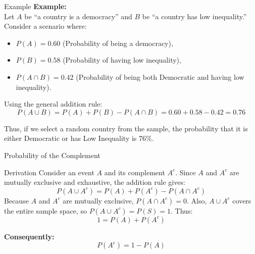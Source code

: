 \documentclass[handout]{beamer} %
\begin{document}
\begin{frame}{Example}
    \textbf{Example:}\\[0.5ex]
    Let \(A\) be “a country is a democracy” and \(B\) be “a country has low inequality.” Consider a scenario where:
    \begin{itemize}
        \item \(P(A) = 0.60\) (Probability of being a democracy),\pause
        \item \(P(B) = 0.58\) (Probability of having low inequality),\pause
        \item \(P(A \cap B) = 0.42\) (Probability of being both Democratic and having low inequality).\pause
    \end{itemize}
   
    Using the general addition rule:
    \[
    P(A \cup B) = P(A) + P(B) - P(A \cap B) = 0.60 + 0.58 - 0.42 = 0.76
    \]
   
    Thus, if we select a random country from the sample, the probability that it is either Democratic or has Low Inequality is 76\%.
\end{frame}

\begin{frame}{Probability of the Complement}   

    \begin{block}{Derivation}
        Consider an event \(A\) and its complement \(A^c\). Since \(A\) and \(A^c\) are mutually exclusive and exhaustive, the addition rule gives:\pause
        \[
        P(A \cup A^c) = P(A) + P(A^c) - P(A \cap A^c)
        \]\pause
        Because \(A\) and \(A^c\) are mutually exclusive, \(P(A \cap A^c) = 0\). \pause Also, \(A \cup A^c\) covers the entire sample space, so \(P(A \cup A^c) = P(S) = 1\). \pause Thus:
        \[
        1 = P(A) + P(A^c)
        \] \pause
    \end{block}
    \pause
    \textbf{Consequently:}
    \[
    P(A^c) = 1 - P(A)
    \]
\end{frame}
\end{document}
